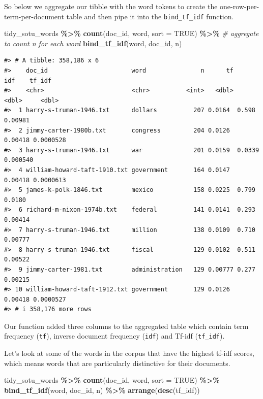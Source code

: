 \documentclass[
]{book}
\newenvironment{Shaded}{\begin{snugshade}}{\end{snugshade}}
\newcommand{\AttributeTok}[1]{\textcolor[rgb]{0.13,0.29,0.53}{#1}}
\newcommand{\CommentTok}[1]{\textcolor[rgb]{0.56,0.35,0.01}{\textit{#1}}}
\newcommand{\ConstantTok}[1]{\textcolor[rgb]{0.56,0.35,0.01}{#1}}
\newcommand{\FunctionTok}[1]{\textcolor[rgb]{0.13,0.29,0.53}{\textbf{#1}}}
\newcommand{\NormalTok}[1]{#1}
\newcommand{\SpecialCharTok}[1]{\textcolor[rgb]{0.81,0.36,0.00}{\textbf{#1}}}
\begin{document}
So below we aggregate our tibble with the word tokens to create the one-row-per-term-per-document table and then pipe it into the \texttt{bind\_tf\_idf} function.

\begin{Shaded}
\begin{Highlighting}[]
\NormalTok{tidy\_sotu\_words }\SpecialCharTok{\%\textgreater{}\%}
  \FunctionTok{count}\NormalTok{(doc\_id, word, }\AttributeTok{sort =} \ConstantTok{TRUE}\NormalTok{)  }\SpecialCharTok{\%\textgreater{}\%}  \CommentTok{\# aggregate to count n for each word}
  \FunctionTok{bind\_tf\_idf}\NormalTok{(word, doc\_id, n) }
\end{Highlighting}
\end{Shaded}

\begin{verbatim}
#> # A tibble: 358,186 x 6
#>    doc_id                       word               n      tf     idf    tf_idf
#>    <chr>                        <chr>          <int>   <dbl>   <dbl>     <dbl>
#>  1 harry-s-truman-1946.txt      dollars          207 0.0164  0.598   0.00981  
#>  2 jimmy-carter-1980b.txt       congress         204 0.0126  0.00418 0.0000528
#>  3 harry-s-truman-1946.txt      war              201 0.0159  0.0339  0.000540 
#>  4 william-howard-taft-1910.txt government       164 0.0147  0.00418 0.0000613
#>  5 james-k-polk-1846.txt        mexico           158 0.0225  0.799   0.0180   
#>  6 richard-m-nixon-1974b.txt    federal          141 0.0141  0.293   0.00414  
#>  7 harry-s-truman-1946.txt      million          138 0.0109  0.710   0.00777  
#>  8 harry-s-truman-1946.txt      fiscal           129 0.0102  0.511   0.00522  
#>  9 jimmy-carter-1981.txt        administration   129 0.00777 0.277   0.00215  
#> 10 william-howard-taft-1912.txt government       129 0.0126  0.00418 0.0000527
#> # i 358,176 more rows
\end{verbatim}

Our function added three columns to the aggregated table which contain term frequency (\texttt{tf}), inverse document frequency (\texttt{idf}) and Tf-idf (\texttt{tf\_idf}).

Let's look at some of the words in the corpus that have the highest tf-idf scores, which means words that are particularly distinctive for their documents.

\begin{Shaded}
\begin{Highlighting}[]
\NormalTok{tidy\_sotu\_words }\SpecialCharTok{\%\textgreater{}\%}
  \FunctionTok{count}\NormalTok{(doc\_id, word, }\AttributeTok{sort =} \ConstantTok{TRUE}\NormalTok{)  }\SpecialCharTok{\%\textgreater{}\%} 
  \FunctionTok{bind\_tf\_idf}\NormalTok{(word, doc\_id, n) }\SpecialCharTok{\%\textgreater{}\%} 
  \FunctionTok{arrange}\NormalTok{(}\FunctionTok{desc}\NormalTok{(tf\_idf))}
\end{Highlighting}
\end{Shaded}
\end{document}
